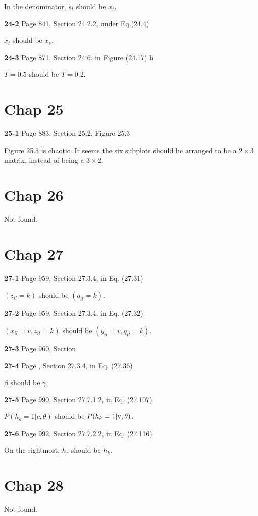 \documentclass[aps,preprint,a4]{revtex4-1}
\begin{document}
In the denominator, $s_{t}$ should be $x_{t}$.

{\color{red}\textbf{24-2}} Page 841, Section 24.2.2, under Eq.(24.4)

$x_{t}$ should be $x_{s}$.

{\color{red}\textbf{24-3}} Page 871, Section 24.6, in Figure (24.17) b

$T = 0.5$ should be $T = 0.2$.


\section{Chap 25}
{\color{red}\textbf{25-1}} Page 883, Section 25.2, Figure 25.3

Figure 25.3 is chaotic. It seems the six subplots should be arranged to be a $2 \times 3$ matrix, instead of
being a $3 \times 2$.


\section{Chap 26}
Not found.




\section{Chap 27}
{\color{red}\textbf{27-1}} Page 959, Section 27.3.4, in Eq. (27.31)

$(z_{il}=k)$ should be $(q_{il}=k)$.

{\color{red}\textbf{27-2}} Page 959, Section 27.3.4, in Eq. (27.32) 

$(x_{il}=v, z_{il}=k)$ should be $(y_{il}=v, q_{il}=k)$.

{\color{red}\textbf{27-3}} Page 960, Section 

{\color{red}\textbf{27-4}} Page , Section 27.3.4, in Eq. (27.36)

$\beta$ should be $\gamma$.

{\color{red}\textbf{27-5}} Page 990, Section 27.7.1.2, in Eq. (27.107)

$P(h_{k}=1|c,\theta)$ should be $P(h_{k}=1|\rm v,\theta)$.

{\color{red}\textbf{27-6}} Page 992, Section 27.7.2.2, in Eq. (27.116)

On the rightmost, $h_{r}$ should be $h_{k}$.

\section{Chap 28}
Not found.

\end{document}
